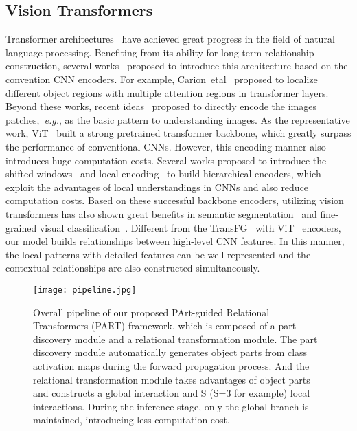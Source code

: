 \documentclass[journal]{IEEEtran}
\def\eg{{\em e.g.}}
\begin{document}
\subsection{Vision Transformers} Transformer architectures~\cite{vaswani2017attention,choromanski2020rethinking} have achieved great progress in the field of natural language processing. Benefiting from its ability for long-term relationship construction, several works~\cite{carion2020end,zhu2020deformable} proposed to introduce this architecture based on the convention CNN encoders.
For example, Carion~etal~\cite{carion2020end} proposed to localize different object regions with multiple attention regions in transformer layers. Beyond these works, recent ideas~\cite{dosovitskiy2020image,liu2021swin,yuan2021tokens,srinivas2021bottleneck} proposed to directly encode the images patches,~\eg,  as the basic pattern to understanding images. As the representative work, ViT~\cite{dosovitskiy2020image} built a strong pretrained transformer backbone, which greatly surpass the performance of conventional CNNs. However, this encoding manner also introduces huge computation costs. Several works proposed to introduce the shifted windows~\cite{liu2021swin} and local encoding~\cite{yuan2021tokens} to build hierarchical encoders, which exploit the advantages of local understandings in CNNs and also reduce computation costs. Based on these successful backbone encoders, utilizing vision transformers has also shown great benefits in semantic segmentation~\cite{xie2021segformer} and fine-grained visual classification~\cite{he2021transfg}.
Different from the TransFG~\cite{he2021transfg} with ViT~\cite{dosovitskiy2020image} encoders, our model builds relationships between high-level CNN features. In this manner, the local patterns with detailed features can be well represented and the contextual relationships are also constructed simultaneously.



\begin{figure*}[!t]
\begin{center}
\texttt{[image: pipeline.jpg]}
 \caption{Overall pipeline of our proposed PArt-guided Relational Transformers (PART) framework, which is composed of a part discovery module and a relational transformation module. The part discovery module automatically generates object parts from class activation maps during the forward propagation process. And the relational transformation module takes advantages of object parts and constructs a global interaction and S (S=3 for example) local interactions. During the inference stage, only the global branch is maintained, introducing less computation cost.}
 \label{fig:pipeline}
 \end{center}
\end{figure*}
\end{document}
